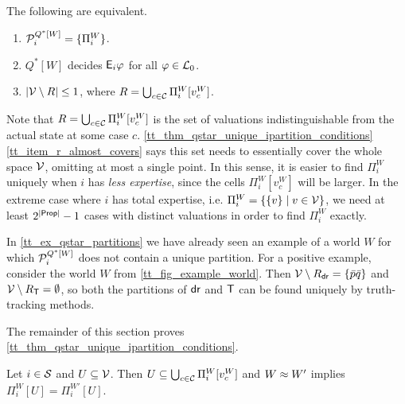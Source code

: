 \begin{theorem}
    \label{tt_thm_qstar_unique_ipartition_conditions}
    The following are equivalent.

    \begin{enumerate}
        \item\label{tt_item_uniquepart} $\mathcal{P}^{Q^*[W]}_i = \{\Pi^W_i\}$.
        \item\label{tt_item_define_all_ephi} $Q^*[W]$ decides $\mathsf{E}_i\varphi$ for all
            $\varphi \in \mathcal{L}_0$.
        \item\label{tt_item_r_almost_covers} $|\mathcal{V} \setminus R| \le 1$, where $R
            = \bigcup_{c \in \mathcal{C}}{\Pi^W_i[v^W_c]}$.
    \end{enumerate}
\end{theorem}

Note that $R = \bigcup_{c \in \mathcal{C}}{\Pi^W_i[v^W_c]}$ is the set of valuations
indistinguishable from the actual state at some case $c$.
\cref{tt_thm_qstar_unique_ipartition_conditions} \cref{tt_item_r_almost_covers} says
this set needs to essentially cover the whole space $\mathcal{V}$, omitting at most a
single point. In this sense, it is easier to find $\Pi^W_i$ uniquely when $i$
has \emph{less expertise}, since the cells $\Pi^W_i[v^W_c]$ will be larger. In
the extreme case where $i$ has total expertise, i.e. $\Pi^W_i = \{\{v\} \mid v
\in \mathcal{V}\}$, we need at least $2^{|\mathsf{Prop}|} - 1$ cases with distinct
valuations in order to find $\Pi^W_i$ exactly.

\begin{example}
    \label{tt_ex_qstar_unique_ipartition_conditions}
    In \cref{tt_ex_qstar_partitions} we have already seen an example of a world
    $W$ for which $\mathcal{P}^{Q^*[W]}_i$ does not contain a unique partition.
    For a positive example, consider the world $W$ from
    \cref{tt_fig_example_world}. Then $\mathcal{V} \setminus R_{\mathsf{dr}{}} =
    \{\bar{p}\bar{q}\}$ and $\mathcal{V} \setminus R_{\mathsf{T}{}} = \emptyset$, so both
    the partitions of $\mathsf{dr}{}$ and $\mathsf{T}{}$ can be found uniquely by
    truth-tracking methods.
\end{example}

The remainder of this section proves
\cref{tt_thm_qstar_unique_ipartition_conditions}.

\begin{lemma}
    \label{tt_lemma_u_expansion_equal}
    Let $i \in \mathcal{S}$ and $U \subseteq \mathcal{V}$. Then $U \subseteq \bigcup_{c \in
    \mathcal{C}}{\Pi^W_i[v^W_c]}$ and $W \approx W'$ implies $\Pi^W_i[U] =
    \Pi^{W'}_i[U]$.
\end{lemma}

